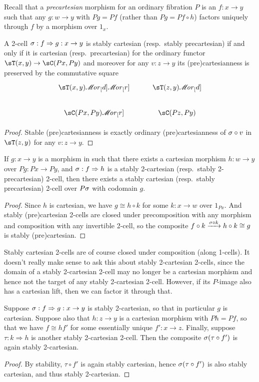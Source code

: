 \documentclass{amsart}
\let\To\Rightarrow
\def\ar#1{\mathscr{M}\!\mathit{or}_{#1}}
\begin{document}
Recall that a \emph{precartesian} morphism for an ordinary fibration $P$ is an $f:x\to y$ such that any $g:w\to y$ with $Pg = Pf$ (rather than $Pg = Pf \circ h$) factors uniquely through $f$ by a morphism over $1_x$.

\begin{lem}\label{thm:stabcart}
  A 2-cell $\si:f\To g:x\to y$ is stably cartesian (resp.\ stably precartesian) if and only if it is cartesian (resp.\ precartesian) for the ordinary functor $\sT(x,y) \to \sC(Px,Py)$ and moreover for any $v:z\to y$ its (pre)cartesianness is preserved by the commutative square
  \[
  \begin{tikzcd}
    \sT(x,y) \ar[d] \ar[r] & \sT(z,y) \ar[d] \\
    \sC(Px,Py) \ar[r] & \sC(Pz,Py)
  \end{tikzcd}
  \]
\end{lem}
\begin{proof}
  Stable (pre)cartesianness is exactly ordinary (pre)cartesianness of $\sigma\circ v$ in $\sT(z,y)$ for any $v:z\to y$.
\end{proof}

\begin{lem}\label{thm:stabcart-cart}
  If $g:x\to y$ is a morphism in \sT such that there exists a cartesian morphism $h:w\to y$ over $Pg:Px \to Py$, and $\si:f\To h$ is a stably 2-cartesian (resp.\ stably 2-precartesian) 2-cell, then there exists a stably cartesian (resp.\ stably precartesian) 2-cell over $P \sigma$ with codomain $g$.
\end{lem}
\begin{proof}
  Since $h$ is cartesian, we have $g \cong h\circ k$ for some $k:x\to w$ over $1_{Px}$.
  And stably (pre)cartesian 2-cells are closed under precomposition with any morphism and composition with any invertible 2-cell, so the composite $f\circ k \xrightarrow{\sigma\circ k} h\circ k \cong g$ is stably (pre)cartesian.
\end{proof}

Stably cartesian 2-cells are of course closed under composition (along 1-cells).
It doesn't really make sense to ask this about stably 2-cartesian 2-cells, since the domain of a stably 2-cartesian 2-cell may no longer be a cartesian morphism and hence not the target of any stably 2-cartesian 2-cell.
However, if its $P$-image also has a cartesian lift, then we can factor it through that.

\begin{lem}\label{thm:2cart-compose}
  Suppose $\si:f\To g:x\to y$ is stably 2-cartesian, so that in particular $g$ is cartesian.
  Suppose also that $h:z\to y$ is a cartesian morphism with $P h = P f$, so that we have $f \cong h f'$ for some essentially unique $f':x\to z$.
  Finally, suppose $\tau : k\To h$ is another stably 2-cartesian 2-cell.
  Then the composite $\sigma (\tau\circ f')$ is again stably 2-cartesian.
\end{lem}
\begin{proof}
  By stability, $\tau\circ f'$ is again stably cartesian, hence $\sigma(\tau\circ f')$ is also stably cartesian, and thus stably 2-cartesian.
\end{proof}
\end{document}
